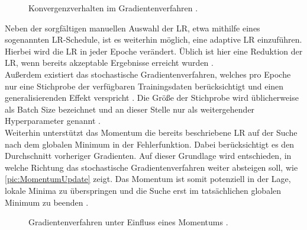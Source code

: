 \begin{figure}[h!]
  \centering
  \caption{Konvergenzverhalten im Gradientenverfahren \cite[S.~429]{ZHA20}.}
  \label{pic:GradientDescent}
\end{figure}

\noindent
Neben der sorgfältigen manuellen Auswahl der \ac{LR}, etwa mithilfe eines sogenannten \ac{LR}-Schedule, ist es weiterhin möglich, eine adaptive \ac{LR} einzuführen. Hierbei wird die \ac{LR} in jeder Epoche verändert. Üblich ist hier eine Reduktion der \ac{LR}, wenn bereits akzeptable Ergebnisse erreicht wurden \cite[S.~433]{ZHA20}.\\

\noindent
Außerdem existiert das stochastische Gradientenverfahren, welches pro Epoche nur eine Stichprobe der verfügbaren Trainingsdaten berücksichtigt und einen generalisierenden Effekt verspricht \cite[S.~437]{ZHA20}. Die Größe der Stichprobe wird üblicherweise als Batch Size bezeichnet und an dieser Stelle nur als weitergehender Hyperparameter genannt \cite[S.~446]{ZHA20}.\\

\noindent
Weiterhin unterstützt das Momentum die bereits beschriebene \ac{LR} auf der Suche nach dem globalen Minimum in der Fehlerfunktion. Dabei berücksichtigt es den Durchschnitt vorheriger Gradienten. Auf dieser Grundlage wird entschieden, in welche Richtung das stochastische Gradientenverfahren weiter absteigen soll, wie \autoref{pic:MomentumUpdate} zeigt. Das Momentum ist somit potenziell in der Lage, lokale Minima zu überspringen und die Suche erst im tatsächlichen globalen Minimum zu beenden \cite[S.~453-456]{ZHA20}.\\

\begin{figure}[h!]
  \centering
  \caption{Gradientenverfahren unter Einfluss eines Momentums \cite{CSNOJ}.}
  \label{pic:MomentumUpdate}
\end{figure}

